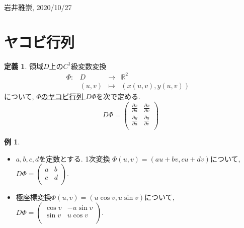 \documentclass[dvipdfmx,a4paper,11pt]{article}
\newcommand{\R}{\mathbb{R}}
\theoremstyle{definition}
\newtheorem{dfn}[thm]{定義}
\newtheorem{exa}[thm]{例}
\newcommand{\pdrv}[2]{\frac{\partial #1}{\partial #2}}
\begin{document}
\begin{flushright}
 岩井雅崇, 2020/10/27
\end{flushright}


\section{ヤコビ行列}
\begin{tcolorbox}[
    colback = white,
    colframe = green!35!black,
    fonttitle = \bfseries,
    breakable = true]
    \begin{dfn}
 領域$D$上の$C^1$級変数変換
 $$
\begin{array}{ccccc}
\Phi: &D & \rightarrow & \R^2 & \\
&(u,v) & \longmapsto & (x(u,v),y(u,v))&
\end{array}
$$
について, \underline{$\Phi$のヤコビ行列 }$D\Phi$を次で定める.
$$
D\Phi
=
\left(\begin{array}{cc} \pdrv{x}{u} & \pdrv{x}{v} \\ \pdrv{y}{u}& \pdrv{y}{v} \\ \end{array} \right)
$$

    \end{dfn}
    \end{tcolorbox}

\begin{exa}
\text{}
\begin{itemize}
\item $a,b,c,d$を定数とする.
1次変換
$\Phi(u,v)  = (au+bv, cu+dv)$について, 
$D\Phi = \left(\begin{array}{cc} a& b\\ c& d\\ \end{array} \right).$
\item 極座標変換$\Phi(u,v)  = (u \cos v, u \sin v)$について, 
$D\Phi = \left(\begin{array}{cc} \cos v& -u\sin v\\ \sin v& u \cos v\\ \end{array} \right).$
\end{itemize}

\end{exa}
\end{document}
